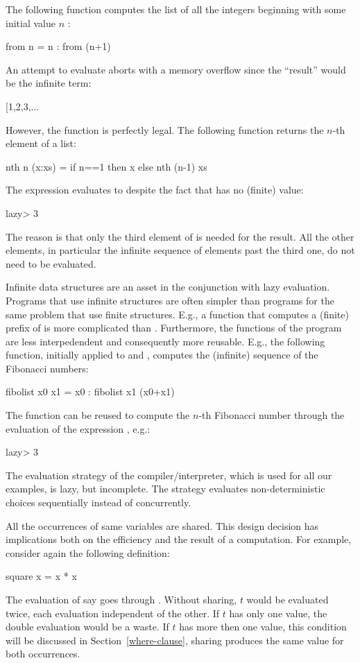 The following function computes the list of
all the integers beginning with some initial value $n$
:
%
\begin{curry}
from n = n : from (n+1)
\end{curry}
%
An attempt to evaluate  aborts with a
memory overflow since the ``result'' would be the infinite term:
%
\begin{curry}
[1,2,3,...
\end{curry}
%
However, the function  is perfectly legal.
The following function returns the $n$-th element of a list:
%
\begin{curry}
nth n (x:xs) = if n==1 then x else nth (n-1) xs
\end{curry}
%
The expression  evaluates to 
despite the fact that  has no (finite) value:
%
\begin{prog}
lazy> 
3
\end{prog}
%
The reason is that only the third element of  
is needed for the result.
All the other elements, in particular the infinite sequence
of elements past the third one, do not need to be evaluated.

Infinite data structures
are an asset in the conjunction with lazy evaluation.
Programs that use infinite structures are often simpler
than programs for the same problem that use finite structures.
E.g., a function that computes a (finite) prefix of \ccode{[1,2,3,...}
is more complicated than .
Furthermore, the functions of the program are less interpedendent
and consequently more reusable.
E.g., the following function, initially applied to
 and , computes the (infinite) sequence of
the Fibonacci numbers:
%
\begin{curry}
fibolist x0 x1 = x0 : fibolist x1 (x0+x1)
\end{curry}
%
The function  can be reused to compute the $n$-th
Fibonacci number through the evaluation of the expression
, e.g.:
%
\begin{prog}
lazy> 
3
\end{prog}
%
The evaluation strategy of the \pakcs{} compiler/interpreter,
which is used for all our examples, is lazy, but incomplete.
The strategy evaluates non-deterministic choices sequentially instead
of concurrently.

All the occurrences of same variables are shared.
This design decision has implications both on the efficiency
and the result of a computation.
For example, consider again the following definition:
%
\begin{curry}
square x = x * x
\end{curry}
%
The evaluation of say  goes through
.  Without sharing, $t$ would be evaluated
twice, each evaluation independent of the other.
If $t$ has only one value, the double evaluation
would be a waste.
If $t$ has more then one value, this condition will be
discussed in Section~\ref{where-clause},
sharing produces the same value for both occurrences.

